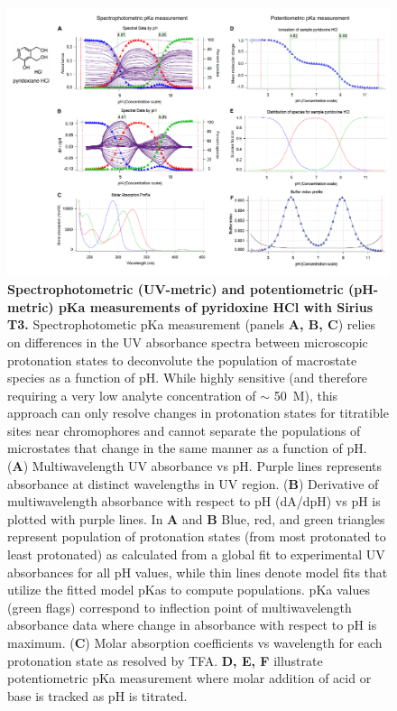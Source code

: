\documentclass[9pt,lineno]{elife}
\begin{document}
\begin{figure}
\includegraphics[width=1.00\linewidth]{figures/UVmetric_vs_pHmetric_pKa_figure}
\caption{{\bf Spectrophotometric (UV-metric) and potentiometric (pH-metric) pKa measurements of pyridoxine HCl with Sirius T3.} 
Spectrophotometic pKa measurement (panels \textbf{A, B, C}) relies on differences in the UV absorbance spectra between microscopic protonation states to deconvolute the population of macrostate species as a function of pH.
While highly sensitive (and therefore requiring a very low analyte concentration of $\sim$ 50~\micro M), this approach can only resolve changes in protonation states for titratible sites near chromophores and cannot separate the populations of microstates that change in the same manner as a function of pH. 
(\textbf{A}) Multiwavelength UV absorbance vs pH. Purple lines represents absorbance at distinct wavelengths in UV region.
(\textbf{B}) Derivative of multiwavelength absorbance with respect to pH (dA/dpH) vs pH is plotted with purple lines. 
In \textbf{A} and \textbf{B} Blue, red, and green triangles represent population of protonation states (from most protonated to least protonated) as calculated from a global fit to experimental UV absorbances for all pH values, while thin lines denote model fits that utilize the fitted model pKas to compute populations.
pKa values (green flags) correspond to inflection point of multiwavelength absorbance data where change in absorbance with respect to pH is maximum. 
(\textbf{C}) Molar absorption coefficients vs wavelength for each protonation state as resolved by TFA. 
\textbf{D, E, F} illustrate potentiometric pKa measurement where molar addition of acid or base is tracked as pH is titrated.
}
\end{figure}
\end{document}
